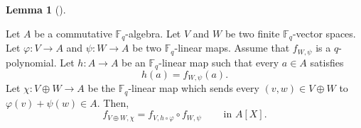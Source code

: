 \documentclass[numbers=enddot,12pt,final,onecolumn,notitlepage]{scrartcl}%
\theoremstyle{definition}
\newtheorem{lem}[theo]{Lemma}
\newenvironment{lemma}[1][]
{\begin{lem}[#1]\begin{leftbar}}
{\end{leftbar}\end{lem}}
\begin{document}
\begin{lemma}
\label{lem.mac1.too-early}Let $A$ be a commutative $\mathbb{F}_{q}$-algebra.
Let $V$ and $W$ be two finite $\mathbb{F}_{q}$-vector spaces. Let
$\varphi:V\rightarrow A$ and $\psi:W\rightarrow A$ be two $\mathbb{F}_{q}%
$-linear maps. Assume that $f_{W,\psi}$ is a $q$-polynomial. Let
$h:A\rightarrow A$ be an $\mathbb{F}_{q}$-linear map such that every $a\in A$
satisfies%
\begin{equation}
h\left(  a\right)  =f_{W,\psi}\left(  a\right)  .
\label{eq.lem.mac1.too-early.ass}%
\end{equation}
Let $\chi:V\oplus W\rightarrow A$ be the $\mathbb{F}_{q}$-linear map which
sends every $\left(  v,w\right)  \in V\oplus W$ to $\varphi\left(  v\right)
+\psi\left(  w\right)  \in A$. Then,%
\[
f_{V\oplus W,\chi}=f_{V,h\circ\varphi}\circ f_{W,\psi}%
\ \ \ \ \ \ \ \ \ \ \text{in }A\left[  X\right]  .
\]

\end{lemma}
\end{document}
